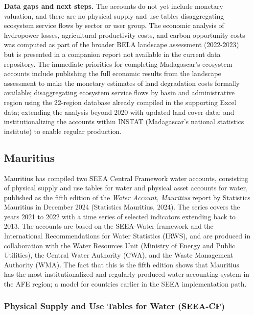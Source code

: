 \documentclass[
  letterpaper,
  DIV=11,
  numbers=noendperiod]{scrartcl}
\begin{document}
\textbf{Data gaps and next steps.} The accounts do not yet include
monetary valuation, and there are no physical supply and use tables
disaggregating ecosystem service flows by sector or user group. The
economic analysis of hydropower losses, agricultural productivity costs,
and carbon opportunity costs was computed as part of the broader BELA
landscape assessment (2022-2023) but is presented in a companion report
not available in the current data repository. The immediate priorities
for completing Madagascar's ecosystem accounts include publishing the
full economic results from the landscape assessment to make the monetary
estimates of land degradation costs formally available; disaggregating
ecosystem service flows by basin and administrative region using the
22-region database already compiled in the supporting Excel data;
extending the analysis beyond 2020 with updated land cover data; and
institutionalizing the accounts within INSTAT (Madagascar's national
statistics institute) to enable regular production.

\subsection{Mauritius}\label{mauritius}

Mauritius has compiled two SEEA Central Framework water accounts,
consisting of physical supply and use tables for water and physical
asset accounts for water, published as the fifth edition of the
\emph{Water Account, Mauritius} report by Statistics Mauritius in
December 2024 (Statistics Mauritius, 2024). The series covers the years
2021 to 2022 with a time series of selected indicators extending back to
2013. The accounts are based on the SEEA-Water framework and the
International Recommendations for Water Statistics (IRWS), and are
produced in collaboration with the Water Resources Unit (Ministry of
Energy and Public Utilities), the Central Water Authority (CWA), and the
Waste Management Authority (WMA). The fact that this is the fifth
edition shows that Mauritius has the most institutionalized and
regularly produced water accounting system in the AFE region; a model
for countries earlier in the SEEA implementation path.

\subsubsection{Physical Supply and Use Tables for Water
(SEEA-CF)}\label{physical-supply-and-use-tables-for-water-seea-cf}
\end{document}
